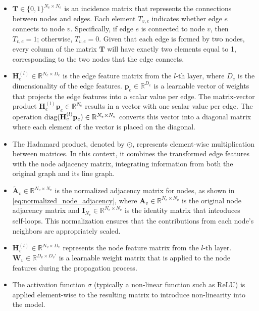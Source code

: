 \begin{itemize}
    \item \( \mathbf{T} \in \{0, 1\}^{N_v \times N_e} \) is an incidence matrix that represents the connections between nodes and edges. Each element \( T_{v,e} \) indicates whether edge \( e \) connects to node \( v \). Specifically, if edge \( e \) is connected to node \( v \), then \( T_{v,e} = 1 \); otherwise, \( T_{v,e} = 0 \). Given that each edge is formed by two nodes, every column of the matrix \( \mathbf{T} \) will have exactly two elements equal to 1, corresponding to the two nodes that the edge connects. 

    \item \( \mathbf{H}^{(l)}_e \in \mathbb{R}^{N_e \times D_e} \) is the edge feature matrix from the \( l \)-th layer, where \( D_e \) is the dimensionality of the edge features. \( \mathbf{p}_e \in \mathbb{R}^{D_e} \) is a learnable vector of weights that projects the edge features into a scalar value per edge. The matrix-vector product \( \mathbf{H}^{(l)}_e \mathbf{p}_e \in \mathbb{R}^{N_e} \) results in a vector with one scalar value per edge. The operation \( \textup{diag}(\mathbf{H}^{(l)}_e \mathbf{p}_e) \in \mathbb{R}^{N_e \times N_e} \) converts this vector into a diagonal matrix where each element of the vector is placed on the diagonal.
   
       \item The Hadamard product, denoted by \( \odot \), represents element-wise multiplication between matrices. In this context, it combines the transformed edge features with the node adjacency matrix, integrating information from both the original graph and its line graph.
    \item \( \tilde{\mathbf{A}}_v \in \mathbb{R}^{N_v \times N_v} \) is the normalized adjacency matrix for nodes, as shown in \cref{eq:normalized_node_adjacency}, where \( \mathbf{A}_v \in \mathbb{R}^{N_v \times N_v} \) is the original node adjacency matrix and \( \mathbf{I}_{N_v} \in \mathbb{R}^{N_v \times N_v} \) is the identity matrix that introduces self-loops. This normalization ensures that the contributions from each node's neighbors are appropriately scaled. 

    \item \( \mathbf{H}^{(l)}_v \in \mathbb{R}^{N_v \times D_v} \) represents the node feature matrix from the \( l \)-th layer. \( \mathbf{W}_v \in \mathbb{R}^{D_v \times D_v'} \) is a learnable weight matrix that is applied to the node features during the propagation process.
    
    \item The activation function \( \sigma \) (typically a non-linear function such as ReLU) is applied element-wise to the resulting matrix to introduce non-linearity into the model.
\end{itemize}




